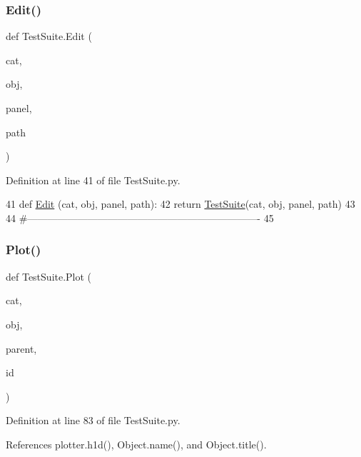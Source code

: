 \subsubsection{\texorpdfstring{Edit()}{Edit()}}
{\footnotesize\ttfamily def Test\+Suite.\+Edit (\begin{DoxyParamCaption}\item[{}]{cat,  }\item[{}]{obj,  }\item[{}]{panel,  }\item[{}]{path }\end{DoxyParamCaption})}



Definition at line 41 of file Test\+Suite.\+py.


\begin{DoxyCode}
41 \textcolor{keyword}{def }\hyperlink{namespaceTestSuite_a7b3d5b63aa0a4de85e213ad4484861e1}{Edit} (cat, obj, panel, path):
42     \textcolor{keywordflow}{return} \hyperlink{classTestSuite}{TestSuite}(cat, obj, panel, path)
43 
44 \textcolor{comment}{#----------------------------------------------------------------------}
45 
\end{DoxyCode}
\mbox{\label{namespaceTestSuite_a2ea7dee6a6c49e8e2fb533cb0a6a4c83}} 
\subsubsection{\texorpdfstring{Plot()}{Plot()}}
{\footnotesize\ttfamily def Test\+Suite.\+Plot (\begin{DoxyParamCaption}\item[{}]{cat,  }\item[{}]{obj,  }\item[{}]{parent,  }\item[{}]{id }\end{DoxyParamCaption})}



Definition at line 83 of file Test\+Suite.\+py.



References plotter.\+h1d(), Object.\+name(), and Object.\+title().


